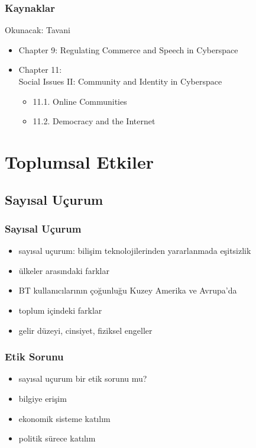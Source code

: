 \documentclass[dvipsnames]{beamer}
\theoremstyle{plain}
\begin{document}
\begin{frame}
  \frametitle{Kaynaklar}

  \begin{block}{Okunacak: Tavani}
    \begin{itemize}
      \item Chapter 9: \alert{Regulating Commerce and Speech in Cyberspace}
      \item Chapter 11:\\
        Social Issues II: Community and Identity in Cyberspace
      \begin{itemize}
          \item 11.1. \alert{Online Communities}
          \item 11.2. \alert{Democracy and the Internet}
      \end{itemize}
    \end{itemize}
  \end{block}
\end{frame}

\section{Toplumsal Etkiler}

\subsection{Sayısal Uçurum}

\begin{frame}
  \frametitle{Sayısal Uçurum}

  \begin{itemize}
    \item \alert{sayısal uçurum}:
      bilişim teknolojilerinden yararlanmada eşitsizlik

    \medskip
    \item ülkeler arasındaki farklar
    \item BT kullanıcılarının çoğunluğu Kuzey Amerika ve Avrupa'da

    \medskip
    \item toplum içindeki farklar
    \item gelir düzeyi, cinsiyet, fiziksel engeller
  \end{itemize}
\end{frame}

\begin{frame}
  \frametitle{Etik Sorunu}

  \begin{itemize}
    \item sayısal uçurum bir etik sorunu mu?

    \medskip
    \item bilgiye erişim
    \item ekonomik sisteme katılım
    \item politik sürece katılım
  \end{itemize}
\end{frame}
\end{document}
